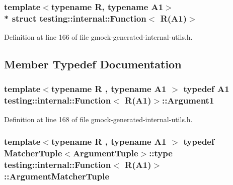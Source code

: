 \subsubsection*{template$<$typename R, typename A1$>$\\*
struct testing\+::internal\+::\+Function$<$ R(\+A1)$>$}



Definition at line 166 of file gmock-\/generated-\/internal-\/utils.\+h.



\subsection{Member Typedef Documentation}
\subsubsection[{\texorpdfstring{Argument1}{Argument1}}]{\setlength{\rightskip}{0pt plus 5cm}template$<$typename R , typename A1 $>$ typedef A1 {\bf testing\+::internal\+::\+Function}$<$ {\bf R}(A1)$>$\+::{\bf Argument1}}\hypertarget{structtesting_1_1internal_1_1_function_3_01_r_07_a1_08_4_aca36c8586218fd015cc4736dc8d4c14f}{}\label{structtesting_1_1internal_1_1_function_3_01_r_07_a1_08_4_aca36c8586218fd015cc4736dc8d4c14f}


Definition at line 168 of file gmock-\/generated-\/internal-\/utils.\+h.

\subsubsection[{\texorpdfstring{Argument\+Matcher\+Tuple}{ArgumentMatcherTuple}}]{\setlength{\rightskip}{0pt plus 5cm}template$<$typename R , typename A1 $>$ typedef {\bf Matcher\+Tuple}$<${\bf Argument\+Tuple}$>$\+::type {\bf testing\+::internal\+::\+Function}$<$ {\bf R}(A1)$>$\+::{\bf Argument\+Matcher\+Tuple}}\hypertarget{structtesting_1_1internal_1_1_function_3_01_r_07_a1_08_4_a0e35671ae43c3d3310893e1d6d895d06}{}\label{structtesting_1_1internal_1_1_function_3_01_r_07_a1_08_4_a0e35671ae43c3d3310893e1d6d895d06}


